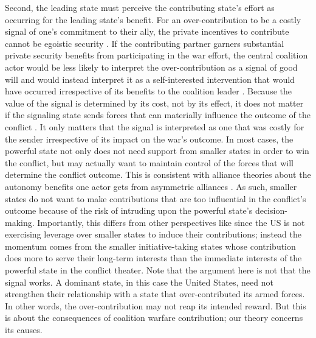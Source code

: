 \documentclass[12pt,letterpaper]{article}
\begin{document}
		Second, the leading state must perceive the contributing state's effort as occurring for the leading state's benefit. For an over-contribution to be a costly signal of one's commitment to their ally, the private incentives to contribute cannot be egoistic security \citep{davidson_americaallieswar_2011}. If the contributing partner garners substantial private security benefits from participating in the war effort, the central coalition actor would be less likely to interpret the over-contribution as a signal of good will and would instead interpret it as a self-interested intervention that would have occurred irrespective of its benefits to the coalition leader \citep{tago_whystatesjoin_2007, lake_hierarchyinternationalrelations_2009, chapman_securingapprovaldomestic_2011}. Because the value of the signal is determined by its cost, not by its effect, it does not matter if the signaling state sends forces that can materially influence the outcome of the conflict \citep{davidson_americaallieswar_2011}. It only matters that the signal is interpreted as one that was costly for the sender irrespective of its impact on the war's outcome. In most cases, the powerful state not only does not need support from smaller states in order to win the conflict, but may actually want to maintain control of the forces that will determine the conflict outcome. This is consistent with alliance theories about the autonomy benefits one actor gets from asymmetric alliances \citep{morrow_alliancesasymmetryalternative_1991}. As such, smaller states do not want to make contributions that are too influential in the conflict's outcome because of the risk of intruding upon the powerful state's decision-making. Importantly, this differs from other perspectives like \citet[72-75]{bennett_burdensharingpersiangulf_1994} since the US is not exercising leverage over smaller states to induce their contributions; instead the momentum comes from the smaller initiative-taking states whose contribution does more to serve their long-term interests than the immediate interests of the powerful state in the conflict theater. Note that the argument here is not that the signal works. A dominant state, in this case the United States, need not strengthen their relationship with a state that over-contributed its armed forces. In other words, the over-contribution may not reap its intended reward. But this is about the consequences of coalition warfare contribution; our theory concerns its causes.
\end{document}
